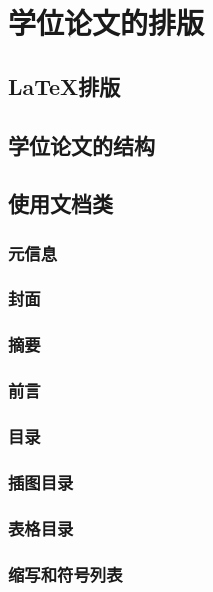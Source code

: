 \chapter{学位论文的排版}

\section{\LaTeX 排版}


\section{学位论文的结构}


\section{使用文档类}

\subsection{元信息}

\subsection{封面}

\subsection{摘要}

\subsection{前言}

\subsection{目录}

\subsection{插图目录}

\subsection{表格目录}

\subsection{缩写和符号列表}

